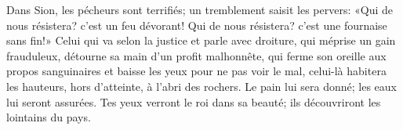 Dans Sion, les pécheurs sont terrifiés; un tremblement saisit les pervers:
	«Qui de nous résistera? c’est un feu dévorant!
	Qui de nous résistera? c’est une fournaise sans fin!»
Celui qui va selon la justice et parle avec droiture,
	qui méprise un gain frauduleux, détourne sa main d’un profit malhonnête,
	qui ferme son oreille aux propos sanguinaires
	et baisse les yeux pour ne pas voir le mal,
	celui-là habitera les hauteurs,
	hors d’atteinte, à l’abri des rochers.
Le pain lui sera donné;
	les eaux lui seront assurées.
Tes yeux verront le roi dans sa beauté;
	ils découvriront les lointains du pays.
